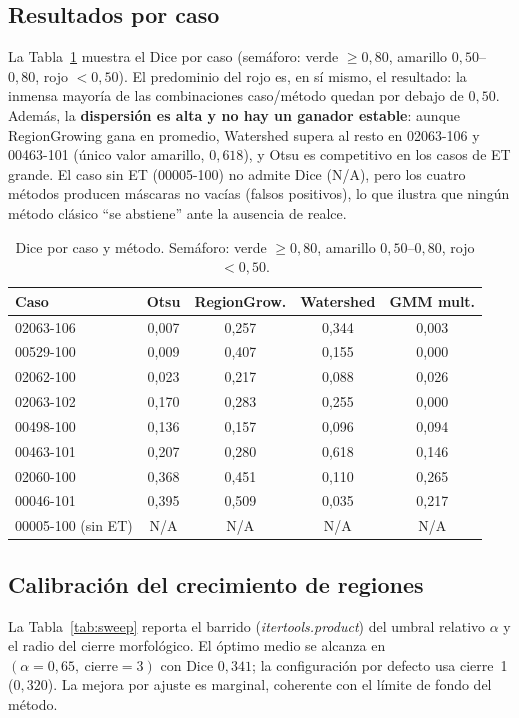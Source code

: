 \documentclass[conference]{IEEEtran}
\newcommand{\cm}[1]{\cellcolor{cellmid}#1}    %
\newcommand{\cb}[1]{\cellcolor{cellbad}#1}    %
\newcommand{\na}{\cellcolor{gray!18}N/A}
\begin{document}
\subsection{Resultados por caso}
La Tabla~\ref{tab:porcaso} muestra el Dice por caso (semáforo:
verde $\ge 0{,}80$, amarillo $0{,}50$--$0{,}80$, rojo $<0{,}50$).
El predominio del rojo es, en sí mismo, el resultado: la inmensa
mayoría de las combinaciones caso/método quedan por debajo de
$0{,}50$. Además, la \textbf{dispersión es alta y no hay un ganador
estable}: aunque RegionGrowing gana en promedio, Watershed supera
al resto en 02063-106 y 00463-101 (único valor amarillo,
$0{,}618$), y Otsu es competitivo en los casos de ET grande. El
caso sin ET (00005-100) no admite Dice (N/A), pero los cuatro
métodos producen máscaras no vacías (falsos positivos), lo que
ilustra que ningún método clásico ``se abstiene'' ante la ausencia
de realce.

\begin{table}[h]
\centering
\caption{Dice por caso y método. Semáforo: verde $\ge 0{,}80$,
amarillo $0{,}50$--$0{,}80$, rojo $<0{,}50$.}
\label{tab:porcaso}
\begin{tabular}{lcccc}
\toprule
Caso & Otsu & RegionGrow. & Watershed & GMM mult. \\
\midrule
02063-106 & \cb{0,007} & \cb{0,257} & \cb{0,344} & \cb{0,003} \\
00529-100 & \cb{0,009} & \cb{0,407} & \cb{0,155} & \cb{0,000} \\
02062-100 & \cb{0,023} & \cb{0,217} & \cb{0,088} & \cb{0,026} \\
02063-102 & \cb{0,170} & \cb{0,283} & \cb{0,255} & \cb{0,000} \\
00498-100 & \cb{0,136} & \cb{0,157} & \cb{0,096} & \cb{0,094} \\
00463-101 & \cb{0,207} & \cb{0,280} & \cm{0,618} & \cb{0,146} \\
02060-100 & \cb{0,368} & \cb{0,451} & \cb{0,110} & \cb{0,265} \\
00046-101 & \cb{0,395} & \cb{0,509} & \cb{0,035} & \cb{0,217} \\
00005-100 (sin ET) & \na & \na & \na & \na \\
\bottomrule
\end{tabular}
\end{table}

\subsection{Calibración del crecimiento de regiones}
La Tabla~\ref{tab:sweep} reporta el barrido
(\textit{itertools.product}) del umbral relativo $\alpha$ y el radio
del cierre morfológico. El óptimo medio se alcanza en
$(\alpha=0{,}65,\ \text{cierre}=3)$ con Dice $0{,}341$; la
configuración por defecto usa cierre~1 ($0{,}320$). La mejora por
ajuste es marginal, coherente con el límite de fondo del método.
\end{document}

